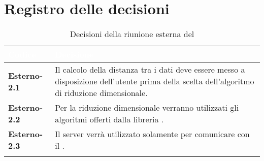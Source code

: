 \section{Registro delle decisioni}
{
\renewcommand{\arraystretch}{1.5}
\centering
\begin{longtable}{C{3cm} C{9cm}}
\textcolor{white}{\textbf{Codice}}&
\textcolor{white}{\textbf{Decisione}}\\	
\endhead
		
\textbf{Esterno-2.1} & Il calcolo della distanza tra i dati deve essere messo a disposizione dell'utente prima della scelta dell'algoritmo di riduzione dimensionale.\\

\textbf{Esterno-2.2} & Per la riduzione dimensionale verranno utilizzati gli algoritmi offerti dalla libreria .\\

\textbf{Esterno-2.3} & Il server verrà utilizzato solamente per comunicare con il .\\

\caption{Decisioni della riunione esterna del \Data{}}
		
\end{longtable}
}



